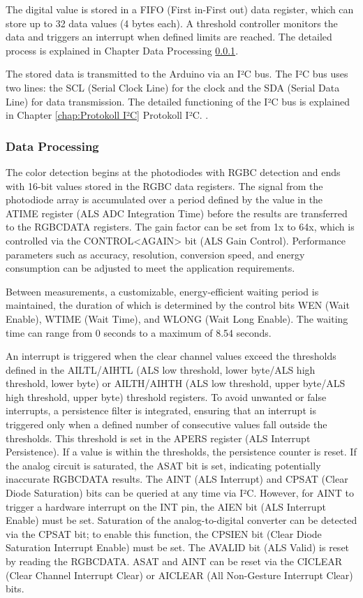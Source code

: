 The digital value is stored in a FIFO (First in-First out) data register, which can store up to 32 data values (4 bytes each). A threshold controller monitors the data and triggers an interrupt when defined limits are reached. The detailed process is explained in Chapter Data Processing \ref{chap:Data Processing}.

The stored data is transmitted to the Arduino via an I²C bus. The I²C bus uses two lines: the SCL (Serial Clock Line) for the clock and the SDA (Serial Data Line) for data transmission. The detailed functioning of the I²C bus is explained in Chapter \ref{chap:Protokoll I²C} Protokoll I²C.
\cite{Avago:2015}.

\subsubsection{Data Processing}
\label{chap:Data Processing}

The color detection begins at the photodiodes with RGBC detection and ends with 16-bit values stored in the RGBC data registers. The signal from the photodiode array is accumulated over a period defined by the value in the ATIME register (ALS ADC Integration Time) before the results are transferred to the RGBCDATA registers. The gain factor can be set from 1x to 64x, which is controlled via the CONTROL<AGAIN> bit (ALS Gain Control). Performance parameters such as accuracy, resolution, conversion speed, and energy consumption can be adjusted to meet the application requirements.

Between measurements, a customizable, energy-efficient waiting period is maintained, the duration of which is determined by the control bits WEN (Wait Enable), WTIME (Wait Time), and WLONG (Wait Long Enable). The waiting time can range from 0 seconds to a maximum of 8.54 seconds.

An interrupt is triggered when the clear channel values exceed the thresholds defined in the AILTL/AIHTL (ALS low threshold, lower byte/ALS high threshold, lower byte) or AILTH/AIHTH (ALS low threshold, upper byte/ALS high threshold, upper byte) threshold registers. To avoid unwanted or false interrupts, a persistence filter is integrated, ensuring that an interrupt is triggered only when a defined number of consecutive values fall outside the thresholds. This threshold is set in the APERS register (ALS Interrupt Persistence). If a value is within the thresholds, the persistence counter is reset. If the analog circuit is saturated, the ASAT bit is set, indicating potentially inaccurate RGBCDATA results. The AINT (ALS Interrupt) and CPSAT (Clear Diode Saturation) bits can be queried at any time via I²C. However, for AINT to trigger a hardware interrupt on the INT pin, the AIEN bit (ALS Interrupt Enable) must be set. Saturation of the analog-to-digital converter can be detected via the CPSAT bit; to enable this function, the CPSIEN bit (Clear Diode Saturation Interrupt Enable) must be set. The AVALID bit (ALS Valid) is reset by reading the RGBCDATA. ASAT and AINT can be reset via the CICLEAR (Clear Channel Interrupt Clear) or AICLEAR (All Non-Gesture Interrupt Clear) bits.

